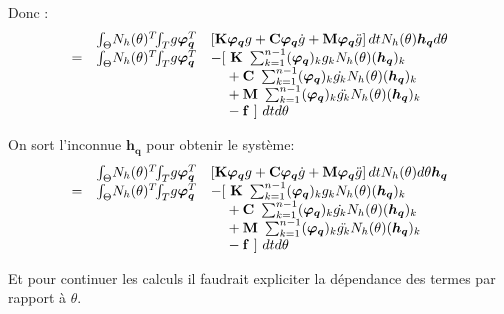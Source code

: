 \documentclass[12pt,a4paper]{report}
\begin{document}
Donc :
\begin{equation}
\begin{array}{r r l}
	&\int_\Theta \!  N_h(\theta)^{T}  \!\! \int_T \! g \boldsymbol{\varphi_q}^T &
						\left[  \mathbf{K} \boldsymbol{\varphi_q}g
							+ \mathbf{C} \boldsymbol{\varphi_q} \dot{g}
							+ \mathbf{M} \boldsymbol{\varphi_q} \ddot{g}
						\right] dt  N_h(\theta) \boldsymbol{h_q} d\theta
	\\ = &\int_\Theta \!  N_h(\theta)^{T}  \!\! \int_T \! g \boldsymbol{\varphi_q}^T &
	  		-[~ \mathbf{K}~ \sum_{k=1}^{n-1} (\boldsymbol{\varphi_q})_k       g_k N_h(\theta) (\boldsymbol{h_q})_k 
	  \\&& \phantom{-[}
			+ \mathbf{C}~ \sum_{k=1}^{n-1} (\boldsymbol{\varphi_q})_k  \dot{g_k} N_h(\theta) (\boldsymbol{h_q})_k 
	  \\&& \phantom{-[}
			+ \mathbf{M}~ \sum_{k=1}^{n-1} (\boldsymbol{\varphi_q})_k \ddot{g_k} N_h(\theta) (\boldsymbol{h_q})_k
	  \\&& \phantom{-[}
			-\mathbf{f}~] ~dt d\theta 
\end{array}
\end{equation}
  
On sort l'inconnue $\boldsymbol{h_q}$ pour obtenir le système:
\begin{equation}
\begin{array}{r r l}
	&\int_\Theta \!  N_h(\theta)^{T}  \!\! \int_T \! g \boldsymbol{\varphi_q}^T &
						\left[  \mathbf{K} \boldsymbol{\varphi_q}g
							+ \mathbf{C} \boldsymbol{\varphi_q} \dot{g}
							+ \mathbf{M} \boldsymbol{\varphi_q} \ddot{g}
						\right] dt  N_h(\theta) d\theta \boldsymbol{h_q}
	\\ = &\int_\Theta \!  N_h(\theta)^{T}  \!\! \int_T \! g \boldsymbol{\varphi_q}^T &
	  		-[~ \mathbf{K}~ \sum_{k=1}^{n-1} (\boldsymbol{\varphi_q})_k       g_k N_h(\theta) (\boldsymbol{h_q})_k 
	  \\&& \phantom{-[}
			+ \mathbf{C}~ \sum_{k=1}^{n-1} (\boldsymbol{\varphi_q})_k  \dot{g_k} N_h(\theta) (\boldsymbol{h_q})_k 
	  \\&& \phantom{-[}
			+ \mathbf{M}~ \sum_{k=1}^{n-1} (\boldsymbol{\varphi_q})_k \ddot{g_k} N_h(\theta) (\boldsymbol{h_q})_k
	  \\&& \phantom{-[}
			-\mathbf{f}~] ~dt d\theta 
\end{array}
\end{equation}

Et pour continuer les calculs il faudrait expliciter la dépendance des termes par rapport à $\theta$.
\end{document}
